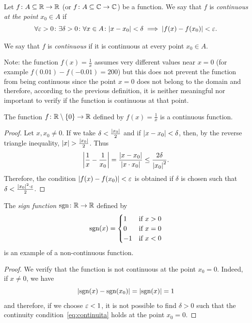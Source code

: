 \begin{definition}
  \label{def:continua}%
    Let $f\colon A \subseteq {\mathbb R} \to {\mathbb R}$ (or $f\colon A\subseteq {\mathbb C} \to {\mathbb C}$) be a
  function. We say that $f$ is \emph{continuous at the point}%
%
 $x_0\in A$ if
  \begin{equation}\label{eq:continuita}
  \forall \varepsilon>0 \colon \exists \delta>0 \colon
  \forall x\in A\colon
  {\left|x-x_0\right|} < \delta \implies {\left|f(x)-f(x_0)\right|} < \varepsilon.
  \end{equation}
  
  We say that $f$ is \emph{continuous}%
%
 if it is continuous at every point $x_0 \in A$.
  \end{definition}
  
  
  Note: the function $f(x)=\frac{1}{x}$
  assumes very different values near $x=0$ (for example $f(0.01)-f(-0.01)=200$)
  but this does not prevent the function from being continuous since the point
  $x=0$ does not belong to the domain and therefore,
  according to the previous definition, it is neither meaningful nor important
  to verify if the function is continuous at that point.
  
  \begin{theorem}
  \label{th:cont_reciproco}%
  The function $f\colon {\mathbb R}\setminus{\left\{ 0 \right\}}\to {\mathbb R}$ defined
  by $f(x)=\frac 1 x$ is a continuous function.
  \end{theorem}
  \begin{proof}
  Let $x,x_0\neq 0$.
  If we take $\delta < \frac{{\left|x_0\right|}}2$
  and if ${\left|x-x_0\right|} < \delta$, then,
  by the reverse triangle inequality,
  ${\left|x\right|} > \frac{{\left|x_0\right|}}2$. Thus
  \[
  {\left|\frac 1 x - \frac 1 {x_0}\right|}
  = \frac{{\left|x-x_0\right|}}{{\left|x\cdot x_0\right|}}
  \le \frac{2\delta}{{\left|x_0\right|}^2}.
  \]
  Therefore, the condition ${\left|f(x)-f(x_0)\right|}<\varepsilon$
  is obtained if $\delta$ is chosen such that
  $\delta < \frac{{\left|x_0\right|}^2\cdot \varepsilon}{2}$.
  \end{proof}
  
  \begin{example}
  The \emph{sign function}%
%
 $\operatorname{sgn}\colon {\mathbb R} \to {\mathbb R}$ defined by
  \[
    \operatorname{sgn}(x) = \begin{cases}
    1 & \text{if $x> 0$}\\
    0 & \text{if $x=0$}\\
    -1 & \text{if $x<0$}
    \end{cases}
  \]
  is an example of a non-continuous function.
  \end{example}
  \begin{proof}
  We verify that the function is not continuous
  at the point $x_0=0$.
  Indeed, if $x\neq 0$, we have
  \[
  {\left|\operatorname{sgn}(x)-\operatorname{sgn}(x_0)\right|} = {\left|\operatorname{sgn}(x)\right|} = 1
  \]
  and therefore, if we choose $\varepsilon<1$, it is not possible
  to find $\delta>0$ such that the continuity condition~\eqref{eq:continuita}
  holds at the point $x_0=0$.
  \end{proof}
  
